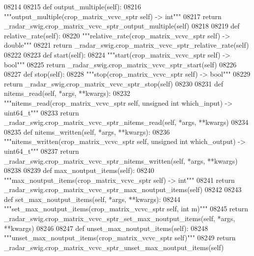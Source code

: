 \begin{DoxyCode}
{{{{{{{{{{{{{{{{{{{{{{{{{{{08214 
08215     \textcolor{keyword}{def }output_multiple(self):
08216         \textcolor{stringliteral}{"""output\_multiple(crop\_matrix\_vcvc\_sptr self) -> int"""}
08217         \textcolor{keywordflow}{return} \_radar\_swig.crop\_matrix\_vcvc\_sptr\_output\_multiple(self)
08218 
08219     \textcolor{keyword}{def }relative_rate(self):
08220         \textcolor{stringliteral}{"""relative\_rate(crop\_matrix\_vcvc\_sptr self) -> double"""}
08221         \textcolor{keywordflow}{return} \_radar\_swig.crop\_matrix\_vcvc\_sptr\_relative\_rate(self)
08222 
08223     \textcolor{keyword}{def }start(self):
08224         \textcolor{stringliteral}{"""start(crop\_matrix\_vcvc\_sptr self) -> bool"""}
08225         \textcolor{keywordflow}{return} \_radar\_swig.crop\_matrix\_vcvc\_sptr\_start(self)
08226 
08227     \textcolor{keyword}{def }stop(self):
08228         \textcolor{stringliteral}{"""stop(crop\_matrix\_vcvc\_sptr self) -> bool"""}
08229         \textcolor{keywordflow}{return} \_radar\_swig.crop\_matrix\_vcvc\_sptr\_stop(self)
08230 
08231     \textcolor{keyword}{def }nitems_read(self, *args, **kwargs):
08232         \textcolor{stringliteral}{"""nitems\_read(crop\_matrix\_vcvc\_sptr self, unsigned int which\_input) -> uint64\_t"""}
08233         \textcolor{keywordflow}{return} \_radar\_swig.crop\_matrix\_vcvc\_sptr\_nitems\_read(self, *args, **kwargs)
08234 
08235     \textcolor{keyword}{def }nitems_written(self, *args, **kwargs):
08236         \textcolor{stringliteral}{"""nitems\_written(crop\_matrix\_vcvc\_sptr self, unsigned int which\_output) -> uint64\_t"""}
08237         \textcolor{keywordflow}{return} \_radar\_swig.crop\_matrix\_vcvc\_sptr\_nitems\_written(self, *args, **kwargs)
08238 
08239     \textcolor{keyword}{def }max_noutput_items(self):
08240         \textcolor{stringliteral}{"""max\_noutput\_items(crop\_matrix\_vcvc\_sptr self) -> int"""}
08241         \textcolor{keywordflow}{return} \_radar\_swig.crop\_matrix\_vcvc\_sptr\_max\_noutput\_items(self)
08242 
08243     \textcolor{keyword}{def }set_max_noutput_items(self, *args, **kwargs):
08244         \textcolor{stringliteral}{"""set\_max\_noutput\_items(crop\_matrix\_vcvc\_sptr self, int m)"""}
08245         \textcolor{keywordflow}{return} \_radar\_swig.crop\_matrix\_vcvc\_sptr\_set\_max\_noutput\_items(self, *args, **kwargs)
08246 
08247     \textcolor{keyword}{def }unset_max_noutput_items(self):
08248         \textcolor{stringliteral}{"""unset\_max\_noutput\_items(crop\_matrix\_vcvc\_sptr self)"""}
08249         \textcolor{keywordflow}{return} \_radar\_swig.crop\_matrix\_vcvc\_sptr\_unset\_max\_noutput\_items(self)
}}}}}}}}}}}}}}}}}}}}}}}}}}}
\end{DoxyCode}
